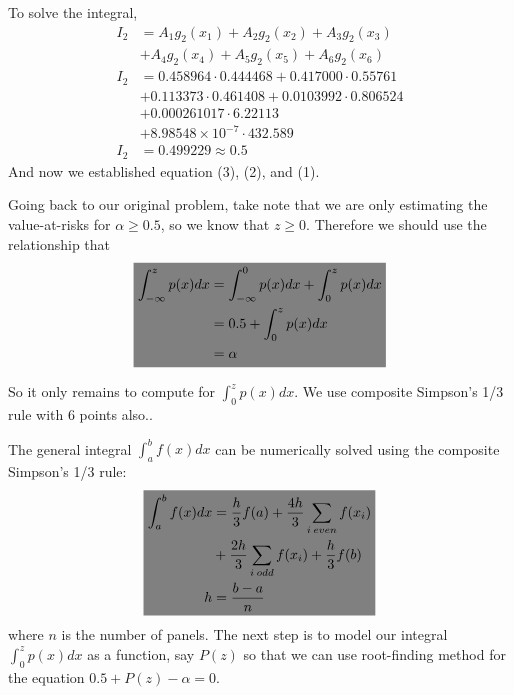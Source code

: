 \documentclass[10pt, twocolumn]{article}
\newcommand{\highlight}[1]{\colorbox{gray}{$\displaystyle#1$}}
\begin{document}
		To solve the integral,
		$$\begin{aligned}
			I_2 &= A_1g_2(x_1) + A_2g_2(x_2) + A_3g_2(x_3)\\
				&+ A_4g_2(x_4) + A_5g_2(x_5) + A_6g_2(x_6)\\
			I_2 &= 0.458964\cdot0.444468 + 0.417000\cdot0.55761\\
				&+ 0.113373\cdot0.461408 + 0.0103992\cdot0.806524\\
				&+ 0.000261017\cdot6.22113\\
				&+ 8.98548\times10^{-7}\cdot432.589\\
			I_2 &= 0.499229 \approx 0.5
		\end{aligned}$$
		And now we established equation (3), (2), and (1).
		
		Going back to our original problem, take note that we are only estimating the value-at-risks for $\alpha\geq0.5$, so we know that $z\geq0$.
		Therefore we should use the relationship that
		$$\highlight{
		\begin{aligned}
			\int_{-\infty}^{z}p(x)dx &= \int_{-\infty}^{0}p(x)dx + \int_{0}^{z}p(x)dx\\
				&= 0.5 + \int_{0}^{z}p(x)dx\\
				&= \alpha
		\end{aligned}}$$
		
		So it only remains to compute for $\int_{0}^{z}p(x)dx$.
		We use composite Simpson's 1/3 rule with 6 points also..
		
		The general integral $\int_{a}^{b}f(x)dx$ can be numerically solved using the composite Simpson's 1/3 rule:
		\begin{equation}\highlight{
		\begin{aligned}
			\int_{a}^{b}f(x)dx &= \frac{h}{3}f(a) + \frac{4h}{3}\sum_{i\:even}f(x_i)\\
			&+ \frac{2h}{3}\sum_{i\:odd}f(x_i) + \frac{h}{3}f(b)\\
			h &= \frac{b-a}{n}
		\end{aligned}}
		\end{equation}
		where $n$ is the number of panels. The next step is to model our integral $\int_{0}^{z}p(x)dx$ as a function, say $P(z)$ so that we can use root-finding method for the equation $0.5 + P(z)-\alpha=0$.
		
\end{document}
